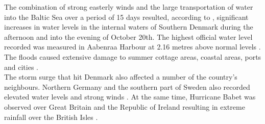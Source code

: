 The combination of strong easterly winds and the large transportation of water into the Baltic Sea over a period of 15 days resulted, according to \cite{kystdirektoratet_stormflod2023}, significant increases in water levels in the internal waters of Southern Denmark during the afternoon and into the evening of October 20th. The highest official water level recorded was measured in Aabenraa Harbour at 2.16 metres above normal levels \citep{damberg_vaerste_2023}. The floods caused extensive damage to summer cottage areas, coastal areas, ports and cities \citep{kystdirektoratet_stormflod2023, naturskaderadet_anmeldelser_2023}.\\
The storm surge that hit Denmark also affected a number of the country's neighbours. Northern Germany and the southern part of Sweden also recorded elevated water levels and strong winds \citep{kiesel_brief_2024}. At the same time, Hurricane Babet was observed over Great Britain and the Republic of Ireland resulting in extreme rainfall over the British Isles \citep{met_office_storm_2023}.